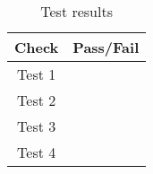 \begin{table}[H]
	\caption{Test results}
	\label{tab:results}
	\centering \fontsize{10}{10}\selectfont
	\begin{tabular}{c | c}
		\hline\hline
		\textbf{Check} 						  		&\textbf{Pass/Fail} \\ 
		\hline
	   Test 1	   			&  \\ 
	   Test 2	   			&  \\ 
	   Test 3	   			&  \\ 
	   Test 4	   			&  \\ 
	   \hline\hline
	\end{tabular}
\end{table}